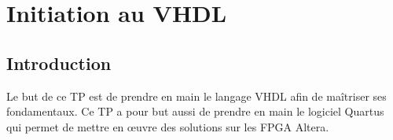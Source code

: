 \chapter{Initiation au VHDL}
\section{Introduction}
Le but de ce TP est de prendre en main le langage VHDL afin de maîtriser ses fondamentaux. Ce TP a pour but aussi de prendre en main le logiciel Quartus qui permet de mettre en œuvre des solutions sur les FPGA Altera.





